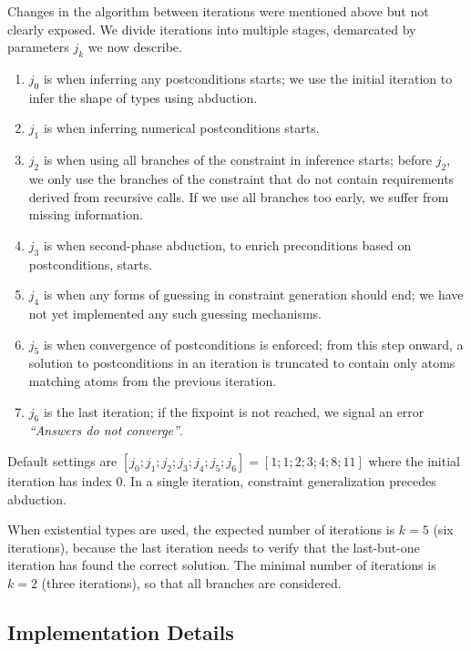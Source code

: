 \documentclass{article}
\newcommand{\tmem}[1]{{\em #1\/}}
\begin{document}
Changes in the algorithm between iterations were mentioned above but not
clearly exposed. We divide iterations into multiple stages, demarcated by
parameters $j_k$ we now describe.
\begin{enumerate}
  \item $j_0$ is when inferring any postconditions starts; we use the initial
  iteration to infer the shape of types using abduction.
  
  \item $j_1$ is when inferring numerical postconditions starts.
  
  \item $j_2$ is when using all branches of the constraint in inference
  starts; before $j_2$, we only use the branches of the constraint that do not
  contain requirements derived from recursive calls. If we use all branches
  too early, we suffer from missing information.
  
  \item $j_3$ is when second-phase abduction, to enrich preconditions based on
  postconditions, starts.
  
  \item $j_4$ is when any forms of guessing in constraint generation should
  end; we have not yet implemented any such guessing mechanisms.
  
  \item $j_5$ is when convergence of postconditions is enforced; from this
  step onward, a solution to postconditions in an iteration is truncated to
  contain only atoms matching atoms from the previous iteration.
  
  \item $j_6$ is the last iteration; if the fixpoint is not reached, we signal
  an error {\tmem{``Answers do not converge''}}.
\end{enumerate}
Default settings are $[j_0 ; j_1 ; j_2 ; j_3 ; j_4 ; j_5 ; j_6] = [1 ; 1 ; 2 ;
3 ; 4 ; 8 ; 11]$ where the initial iteration has index 0. In a single
iteration, constraint generalization precedes abduction.

When existential types are used, the expected number of iterations is $k = 5$
(six iterations), because the last iteration needs to verify that the
last-but-one iteration has found the correct solution. The minimal number of
iterations is $k = 2$ (three iterations), so that all branches are considered.

\subsection{Implementation Details}\label{Details}
\end{document}
